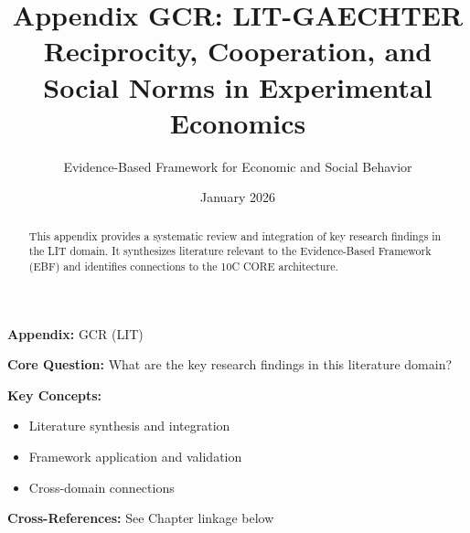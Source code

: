 \documentclass[11pt]{article}
\title{Appendix GCR: LIT-GAECHTER \\
Reciprocity, Cooperation, and Social Norms in Experimental Economics}
\author{Evidence-Based Framework for Economic and Social Behavior}
\date{January 2026}
\begin{document}
\maketitle


\begin{tcolorbox}[colback=blue!5!white, colframe=blue!75!black,
    title=Quick Reference: Appendix GCR]
\textbf{Appendix:} GCR (LIT)

\textbf{Core Question:} What are the key research findings in this literature domain?

\textbf{Key Concepts:}
\begin{itemize}[nosep]
\item Literature synthesis and integration
\item Framework application and validation
\item Cross-domain connections
\end{itemize}

\textbf{Cross-References:} See Chapter linkage below
\end{tcolorbox}


\begin{abstract}
This appendix provides a systematic review and integration of key research findings
in the LIT domain. It synthesizes literature relevant to the Evidence-Based
Framework (EBF) and identifies connections to the 10C CORE architecture.
\end{abstract}
\end{document}

